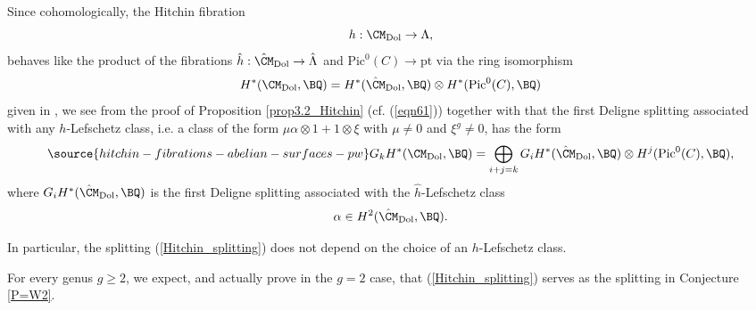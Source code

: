 \begin{rmk}
\notready
Since cohomologically, the Hitchin fibration
\[
h: \CM_{\mathrm{Dol}} \to  \Lambda,
\]
behaves like the product of the fibrations $\hat{h}: \hat{\CM}_{\mathrm{Dol}} \to \hat{\Lambda}$ and $\mathrm{Pic}^0(C) \to \mathrm{pt}$ via the ring isomorphism
\[
H^*(\CM_{\mathrm{Dol}}, \BQ) =H^*(\hat{\CM}_{\mathrm{Dol}}, \BQ) \otimes H^*(\mathrm{Pic}^0(C), \BQ)
\]
given in \cite[Section 2.4]{dCHM1}, we see from the proof of Proposition \ref{prop3.2_Hitchin}
 {(cf. (\ref{eqn61}))} together with \cite[Appendix]{dC} that the first Deligne splitting associated with any
$h$-Lefschetz class, i.e. a class of the form $\mu \alpha\otimes 1+ 1\otimes \xi$ with $\mu\neq 0$ and $\xi^g \neq 0$, has the form
\begin{equation}\label{Hitchin_splitting}
\source{hitchin-fibrations-abelian-surfaces-pw}
G_k H^*(\CM_{\mathrm{Dol}}, \BQ) = \bigoplus_{i+j=k} G_iH^*(\hat{\CM}_{\mathrm{Dol}}, \BQ) \otimes H^j(\mathrm{Pic}^0(C), \BQ),
\end{equation}
where $G_iH^*(\hat{\CM}_{\mathrm{Dol}}, \BQ)$ is the first Deligne splitting associated with the $\hat{h}$-Lefschetz class
\[
\alpha \in H^2(\hat{\CM}_{\mathrm{Dol}}, \BQ).
\]
\begin{rmk}
\notready\label{dolglcansplit}
In particular, the splitting (\ref{Hitchin_splitting}) does not depend on the choice of an  $h$-Lefschetz class.
\end{rmk}
For  every genus $g \geq 2$, we expect, and actually prove in the $g=2$ case, that (\ref{Hitchin_splitting}) serves as the splitting in Conjecture \ref{P=W2}.
\end{rmk}



